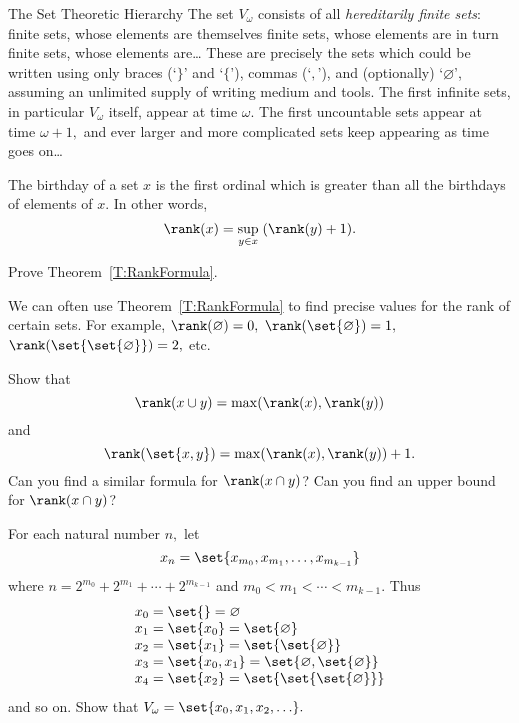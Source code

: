 \begin{unit}{The Set Theoretic Hierarchy}
The set \(V_\omega\) consists of all \emph{hereditarily finite sets}: finite sets, whose elements are themselves finite sets, whose elements are in turn finite sets, whose elements are\ldots{}
These are precisely the sets which could be written using only braces (`\(\}\)' and `\(\{\)'), commas (`\(,\)'), and (optionally) `\(\varnothing\)', assuming an unlimited supply of writing medium and tools.
The first infinite sets, in particular \(V_\omega\) itself, appear at time \(\omega.\)
The first uncountable sets appear at time \(\omega+1,\) and ever larger and more complicated sets keep appearing as time goes on\ldots


\begin{theorem}\label{T:RankFormula}
  The birthday of a set \(x\) is the first ordinal which is greater than all the birthdays of elements of \(x.\)
  In other words, \[\rank(x) = \sup_{y \in x}\;(\rank(y)+1).\]
\end{theorem}

\begin{problem}
  Prove Theorem~\ref{T:RankFormula}.
\end{problem}

We can often use Theorem~\ref{T:RankFormula} to find precise values for the rank of certain sets.
For example, \(\rank(\varnothing) = 0,\) \(\rank(\set{\varnothing}) = 1,\) \(\rank(\set{\set{\varnothing}}) = 2,\) etc.

\begin{problem}
  Show that \[\rank(x \cup y) = \max(\rank(x),\rank(y))\] and \[\rank(\set{x,y}) = \max(\rank(x),\rank(y))+1.\]
  Can you find a similar formula for \(\rank(x \cap y)\)?
  Can you find an upper bound for \(\rank(x \cap y)\)?
\end{problem}

\begin{problem}
  For each natural number \(n,\) let \[x_n = \set{x_{m_0},x_{m_1},\dots,x_{m_{k-1}}}\] where \(n = 2^{m_0}+2^{m_1}+\cdots+2^{m_{k-1}}\) and \(m_0 < m_1 < \cdots < m_{k-1}.\) Thus
  \[\begin{array}{r@{\;=\;}l} 
    x_0 & \set{} = \varnothing \\
    x_1 & \set{x_0} = \set{\varnothing} \\
    x_2 & \set{x_1} = \set{\set{\varnothing}} \\ 
    x_3 & \set{x_0,x_1} = \set{\varnothing,\set{\varnothing}} \\ 
    x_4 & \set{x_2} = \set{\set{\set{\varnothing}}}
  \end{array}\]
  and so on. Show that \(V_\omega = \set{x_0,x_1,x_2,\ldots}.\)
\end{problem}


\end{unit}
